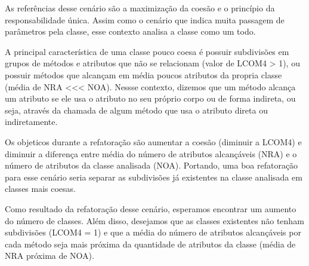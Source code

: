 	As referências desse cenário são a maximização da coesão e o princípio da responsabilidade única. Assim como o cenário que indica muita passagem de parâmetros pela classe, esse contexto analisa a classe como um todo.
	
	A principal característica de uma classe pouco coesa é possuir subdivisões em grupos de métodos e atributos que não se relacionam (valor de LCOM4 > 1), ou possuir métodos que alcançam em média poucos atributos da propria classe (média de NRA <<< NOA). Nessse contexto, dizemos que um método alcança um atributo se ele usa o atributo no seu próprio corpo ou de forma indireta, ou seja, através da chamada de algum método que usa o atributo direta ou indiretamente.
	
	Os objeticos durante a refatoração são aumentar a coesão (diminuir a LCOM4) e diminuir a diferença entre média do número de atributos alcançáveis (NRA) e o número de atributos da classe analisada (NOA). Portando, uma boa refatoração para esse cenário seria separar as subdivisões já existentes na classe analisada em classes mais coesas.
	
	Como resultado da refatoração desse cenário, esperamos encontrar um aumento do número de classes. Além disso, desejamos que as classes existentes não tenham subdivisões (LCOM4 = 1) e que a média do número de atributos alcançáveis por cada método seja mais próxima da quantidade de atributos da classe (média de NRA próxima de NOA).
	






